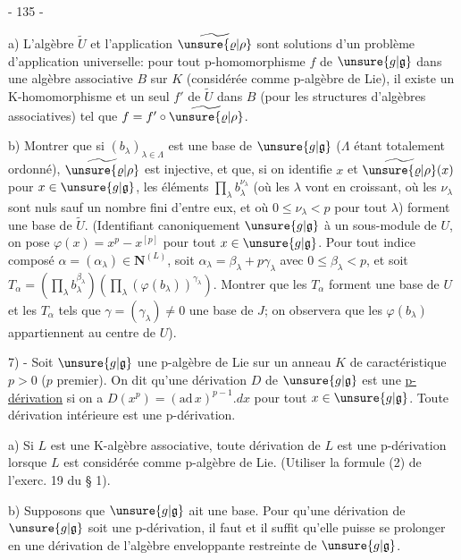 \begin{center}- 135 -\end{center}

a) L'algèbre $\widetilde U$ et l'application $\widetilde{\unsure{\varrho|\rho}}$ sont solutions d'un problème d'application universelle: pour tout p-homomorphisme $f$ de $\unsure{g|\mathfrak g}$ dans une algèbre associative $B$ sur $K$ (considérée comme p-algèbre de Lie), il existe un K-homomorphisme et un seul $f'$ de $\widetilde U$ dans $B$ (pour les structures d'algèbres associatives) tel que $f=f'\circ\widetilde{\unsure{\varrho|\rho}}$.

b) Montrer que si $(b_\lambda)_{\lambda\in\Lambda}$ est une base de $\unsure{g|\mathfrak g}$ ($\Lambda$ étant totalement ordonné), $\widetilde{\unsure{\varrho|\rho}}$ est injective, et que, si on identifie $x$ et $\widetilde{\unsure{\varrho|\rho}}(x)$ pour $x\in\unsure{g|\mathfrak g}$, les éléments $\prod_\lambda b_\lambda^{\nu_\lambda}$ (où les $\lambda$ vont en croissant, où les $\nu_\lambda$ sont nuls sauf un nombre fini d'entre eux, et où $0\leq\nu_\lambda<p$ pour tout $\lambda$) forment une base de $\widetilde U$. (Identifiant canoniquement $\unsure{g|\mathfrak g}$ à un sous-module de $U$, on pose $\varphi(x)=x^p-x^{[p]}$ pour tout $x\in\unsure{g|\mathfrak g}$. Pour tout indice composé $\alpha=(\alpha_\lambda)\in\mathbf N^{(L)}$, soit $\alpha_\lambda=\beta_\lambda+p\gamma_\lambda$ avec $0\leq\beta_\lambda<p$, et soit $T_\alpha=(\prod_\lambda b_\lambda^{\beta_\lambda})(\prod_\lambda(\varphi(b_\lambda))^{\gamma_\lambda})$. Montrer que les $T_\alpha$ forment une base de $U$ et les $T_\alpha$ tels que $\gamma=(\gamma_\lambda)\ne0$ une base de $J$; on observera que les $\varphi(b_\lambda)$ appartiennent au centre de $U$).

7) - Soit $\unsure{g|\mathfrak g}$ une p-algèbre de Lie sur un anneau $K$ de caractéristique $p>0$ ($p$ premier). On dit qu'une dérivation $D$ de $\unsure{g|\mathfrak g}$ est une \uline{p-dérivation} si on a $D(x^p)=(\mathrm{ad}\,x)^{p-1}.dx$ pour tout $x\in\unsure{g|\mathfrak g}$. Toute dérivation intérieure est une p-dérivation.

a) Si $L$ est une K-algèbre associative, toute dérivation de $L$ est une p-dérivation lorsque $L$ est considérée comme p-algèbre de Lie. (Utiliser la formule (2) de l'exerc. 19 du § 1).

b) Supposons que $\unsure{g|\mathfrak g}$ ait une base. Pour qu'une dérivation de $\unsure{g|\mathfrak g}$ soit une p-dérivation, il faut et il suffit qu'elle puisse se prolonger en une dérivation de l'algèbre enveloppante restreinte de $\unsure{g|\mathfrak g}$.
